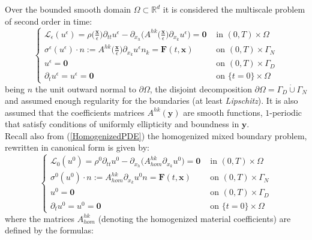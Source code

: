 Over the bounded smooth domain $\Omega \subset \mathbb{R}^d$ it is considered the multiscale problem of second order in time:
\begin{equation}
    \label{MainMultiPDE}
    \left \{
    \begin{array}{cc}
        \mathcal{L}_{\epsilon}(u^{\epsilon}) = \rho\big( \frac{\mathbf{x}}{\epsilon} \big) \partial_{tt} u^{\epsilon} - \partial_{x_h} \big( A^{hk}\big( \frac{\mathbf{x}}{\epsilon} \big) \partial_{x_k} u^{\epsilon} \big)  = \mathbf{0} & \text{ in } (0,T)\times \Omega  \\
        \sigma^{\epsilon}(u^{\epsilon})\cdot n := A^{hk}\big( \frac{\mathbf{x}}{\epsilon} \big) \partial_{x_k} u^{\epsilon} n_k  = \mathbf{F}(t,\mathbf{x}) & \text{ on } (0,T) \times \Gamma_N \\
        u^{\epsilon} =  \mathbf{0} & \text{ on } (0,T) \times \Gamma_D \\
        \partial_t u^{\epsilon} = u^{\epsilon} = \mathbf{0} & \text{ on } \{ t=0 \} \times \Omega 
    \end{array}
    \right.
\end{equation}
being $n$ the unit outward normal to $\partial \Omega$, the disjoint decomposition $\partial \Omega = \Gamma_D \dot \cup \Gamma_N$ and assumed enough regularity for the boundaries (at least \textit{Lipschitz}). It is also assumed that the coefficients matrices $A^{hk}(\mathbf{y})$ are smooth functions, $1$-periodic that satisfy conditions of uniformly ellipticity and boundness in $\mathbf{y}$.\\
Recall also from (\ref{HomogenizedPDE}) the homogenized mixed boundary problem, rewritten in canonical form is given by:
\begin{equation}
    \label{HomMultiPDE}
    \left \{
    \begin{array}{ccc}
        \mathcal{L}_0 (u^0) = \rho^0 \partial_{tt} u^0 - \partial_{x_h}\big( A^{hk}_{hom} \partial_{x_k} u^0 \big) = \mathbf{0} & \text{ in } (0,T)\times \Omega \\
        \sigma^0(u^0) \cdot n := A^{hk}_{hom} \partial_{x_k}u^0 n = \mathbf{F}(t, \mathbf{x}) & \text{ on } (0,T) \times \Gamma_N \\
        u^0 = \mathbf{0} & \text{ on } (0,T) \times \Gamma_D \\
        \partial_t u^0 = u^0 = \mathbf{0} & \text{ on } \{ t=0 \} \times \Omega
    \end{array}
    \right .
\end{equation}
where the matrices $A^{hk}_{hom}$ (denoting the homogenized material coefficients) are defined by the formulas:
